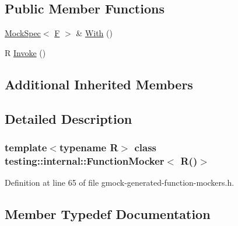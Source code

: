 \subsection*{Public Member Functions}
\begin{DoxyCompactItemize}
\item 
\hyperlink{classtesting_1_1internal_1_1MockSpec}{Mock\+Spec}$<$ \hyperlink{classtesting_1_1internal_1_1FunctionMocker_3_01R_07_08_4_a2c1d7da413176d87405227df90a95521}{F} $>$ \& \hyperlink{classtesting_1_1internal_1_1FunctionMocker_3_01R_07_08_4_af5151d1ae246fab13ac6e890fa2599be}{With} ()
\item 
R \hyperlink{classtesting_1_1internal_1_1FunctionMocker_3_01R_07_08_4_a8096a10aea2ffc6a78d0437855d2ef10}{Invoke} ()
\end{DoxyCompactItemize}
\subsection*{Additional Inherited Members}


\subsection{Detailed Description}
\subsubsection*{template$<$typename R$>$\newline
class testing\+::internal\+::\+Function\+Mocker$<$ R()$>$}



Definition at line 65 of file gmock-\/generated-\/function-\/mockers.\+h.



\subsection{Member Typedef Documentation}
\mbox{\label{classtesting_1_1internal_1_1FunctionMocker_3_01R_07_08_4_a5a279e0d8414bf0809405c06a0725b66}} 
